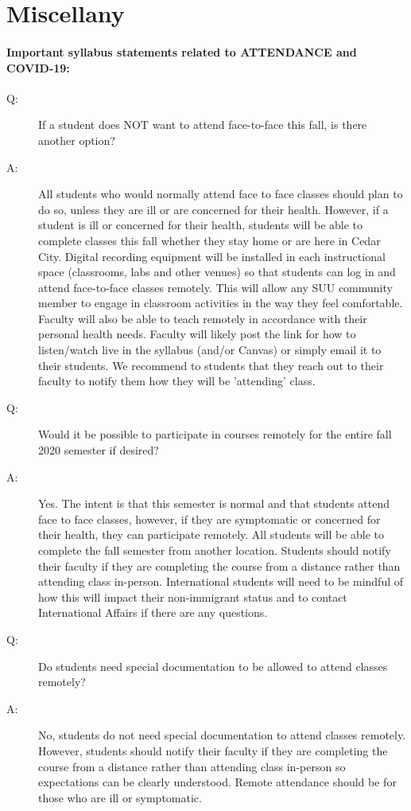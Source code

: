 \documentclass[12pt, letterpaper]{article}
\begin{document}
\section*{Miscellany}
\paragraph{Important syllabus statements related to ATTENDANCE and COVID-19:}
\begin{description}
	\item[Q:~~~~~~] If a student does NOT want to attend face-to-face this fall, is there another option?
	\item[A:~~~~~~] All students who would normally attend face to face classes should plan to do so, unless they are ill or are concerned for their health. However, if a student is ill or concerned for their health, students will be able to complete classes this fall whether they stay home or are here in Cedar City. Digital recording equipment will be installed in each instructional space (classrooms, labs and other venues) so that students can log in and attend face-to-face classes remotely. This will allow any SUU community member to engage in classroom activities in the way they feel comfortable. Faculty will also be able to teach remotely in accordance with their personal health needs. Faculty will likely post the link for how to listen/watch live in the syllabus (and/or Canvas) or simply email it to their students. We recommend to students that they reach out to their faculty to notify them how they will be 'attending' class.
	\item[Q:~~~~~~] Would it be possible to participate in courses remotely for the entire fall 2020 semester if desired?
	\item[A:~~~~~~] Yes. The intent is that this semester is normal and that students attend face to face classes, however, if they are symptomatic or concerned for their health, they can participate remotely. All students will be able to complete the fall semester from another location. Students should notify their faculty if they are completing the course from a distance rather than attending class in-person. International students will need to be mindful of how this will impact their non-immigrant status and to contact International Affairs if there are any questions.
	\item[Q:~~~~~~] Do students need special documentation to be allowed to attend classes remotely?
	\item[A:~~~~~~]  No, students do not need special documentation to attend classes remotely. However, students should notify their faculty if they are completing the course from a distance rather than attending class in-person so expectations can be clearly understood. Remote attendance should be for those who are ill or symptomatic.
\end{description}
\end{document}
